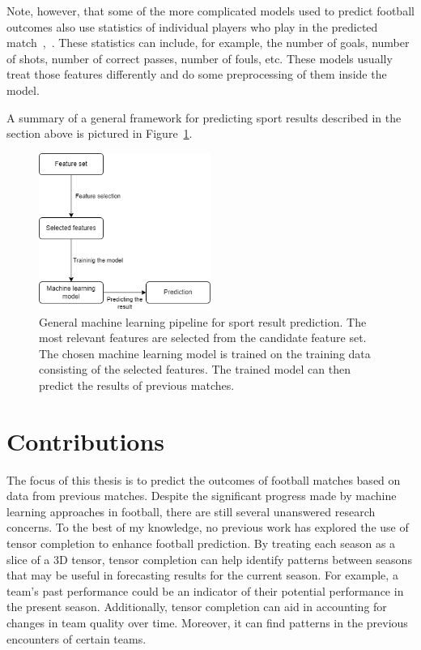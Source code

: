 \documentclass[thesis=M,english]{FITthesis}[2019/12/23]
\begin{document}
Note, however, that some of the more complicated models used to predict football outcomes also use statistics of individual players who play in the predicted match~\cite{football_players},~\cite{NBA_convolution}. These statistics can include, for example, the number of goals, number of shots, number of correct passes, number of fouls, etc. These models usually treat those features differently and do some preprocessing of them inside the model.

A summary of a general framework for predicting sport results described in the section above is pictured in Figure~\ref{fig:ml_diagram}.

\begin{figure}[h]
    \centering
    \includegraphics[width=0.5\textwidth]{figures/ml_diagram.png}
    \caption{General machine learning pipeline for sport result prediction. The most relevant features are selected from the candidate feature set. The chosen machine learning model is trained on the training data consisting of the selected features. The trained model can then predict the results of previous matches.}
    \label{fig:ml_diagram}
\end{figure}

\section{Contributions}

The focus of this thesis is to predict the outcomes of football matches based on data from previous matches. Despite the significant progress made by machine learning approaches in football, there are still several unanswered research concerns. To the best of my knowledge, no previous work has explored the use of tensor completion to enhance football prediction. By treating each season as a slice of a 3D tensor, tensor completion can help identify patterns between seasons that may be useful in forecasting results for the current season. For example, a team's past performance could be an indicator of their potential performance in the present season. Additionally, tensor completion can aid in accounting for changes in team quality over time. Moreover, it can find patterns in the previous encounters of certain teams.
\end{document}
